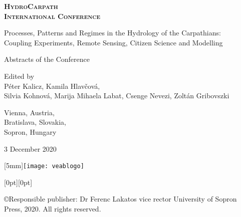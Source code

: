 \begin{titlepage}
\centering
\scshape
\large
\bfseries
HydroCarpath \\
International Conference

\vspace{0.5cm}
Processes, Patterns and Regimes in the Hydrology of the Carpathians:\\
Coupling Experiments, Remote Sensing, Citizen Science and Modelling
\upshape
\normalsize
\mdseries

\vspace{1cm}
Abstracts of the Conference

\vspace{3cm}
Edited by\\
Péter Kalicz, Kamila Hlavčová,\\
Silvia Kohnová, Marija Mihaela Labat, Csenge Nevezi, Zoltán Gribovszki


\vfill
Vienna, Austria, \\
Bratislava, Slovakia, \\
Sopron, Hungary

3 December 2020
\end{titlepage}

\newpage{}
\thispagestyle{empty}
\hspace*{\fill} \hspace{4mm} \raisebox{-11mm}[5mm]{\texttt{[image: veablogo]}}

\vspace{2 cm}


\vspace*{\fill}

\hspace*{\fill} \hspace{1mm} \raisebox{0mm}[0pt][0pt]{}

\noindent{}\copyright{\footnotesize{}Responsible publisher:\newline{} Dr Ferenc Lakatos vice rector\newline{} University of Sopron Press, 2020. All rights reserved.}


